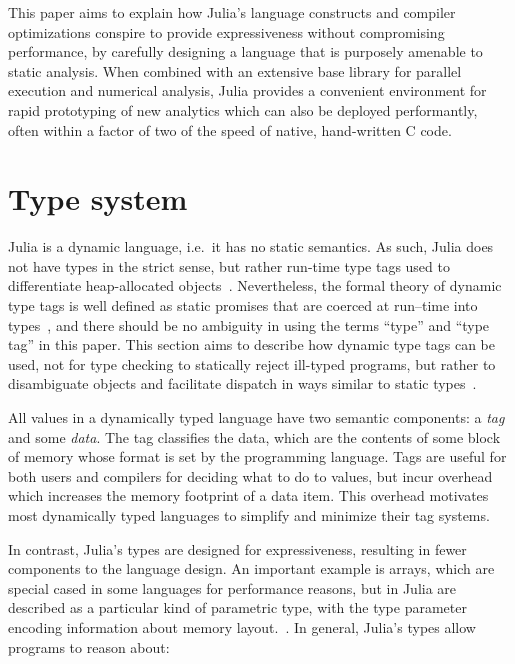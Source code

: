 \documentclass[pldi]{sigplanconf-pldi15}
\begin{document}
This paper aims to explain how Julia's language constructs and compiler
optimizations conspire to provide expressiveness without compromising
performance, by carefully designing a language that is purposely amenable to
static analysis. When combined with an extensive base library for parallel
execution and numerical analysis, Julia provides a convenient environment for
rapid prototyping of new analytics which can also be deployed performantly,
often within a factor of two of the speed of native, hand-written C code.



\section{Type system}

Julia is a dynamic language, i.e.\ it has no static semantics. As such, Julia
does not have types in the strict sense, but rather run-time type tags used to
differentiate heap-allocated objects~\cite[Section 11.10, p. 142]{Pierce2002}.
Nevertheless, the formal theory of dynamic type tags is well defined as static
promises that are coerced at run--time into 
types~\cite{Henglein1994,Shields1998,Baars2002}, and there should be no ambiguity
in using the terms ``type'' and ``type tag'' in this paper. This
section aims to describe how dynamic type tags can be used, not for type
checking to statically reject ill-typed programs, but rather to disambiguate
objects and facilitate dispatch in ways similar to static
types~\cite{Tratt2009,Kell2014}.

All values in a dynamically typed language have two semantic components:
a \emph{tag} and some \emph{data}. The tag classifies the data, which are the
contents of some block of memory whose format is set by the programming
language. Tags are useful for both users and compilers for deciding what to do
to values, but incur overhead which increases the memory footprint of a data
item. This overhead motivates most dynamically typed languages to simplify and
minimize their tag systems.

In contrast, Julia's types are designed for expressiveness, resulting in fewer
components to the language design. An important example is arrays, which are
special cased in some languages for performance reasons, but in Julia are
described as a particular kind of parametric type, with the type parameter
encoding information about memory layout.~\cite{Bezanson2014}. In general,
Julia's types allow programs to reason about:
\end{document}
